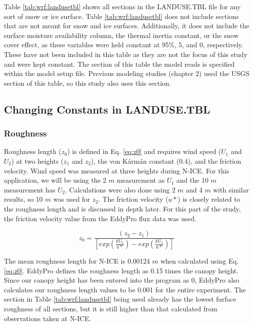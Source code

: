 Table \ref{tab:wrf:landusetbl} shows all sections in the LANDUSE.TBL file for any sort of snow or ice surface. Table \ref{tab:wrf:landusetbl} does not include sections that are not meant for snow and ice surfaces. Additionally, it does not include the surface moisture availability column, the thermal inertia constant, or the snow cover effect, as these variables were held constant at 95$\%$, 5, and 0, respectively. These have not been included in this table as they are not the focus of this study and were kept constant. The section of this table the model reads is specified within the model setup file. Previous modeling studies (chapter 2) used the USGS section of this table, so this study also uses this section. 

\subsection{Changing Constants in LANDUSE.TBL}
\subsubsection{Roughness}

Roughness length ($z_{0}$) is defined in Eq. \ref{eq:z0} and requires wind speed ($U_{1}$ and $U_{2}$) at two heights ($z_{1}$ and $z_{2}$), the von K\'{a}rm\'{a}n constant (0.4), and the friction velocity. Wind speed was measured at three heights during N-ICE. For this application, we will be using the 2 $m$ measurement as $U_{1}$ and the 10 $m$ measurement has $U_{2}$. Calculations were also done using 2 $m$ and 4 $m$ with similar results, so 10 $m$ was used for $z_{2}$. The friction velocity ($u*$) is closely related to the roughness length and is discussed in depth later. For this part of the study, the friction velocity value from the EddyPro flux data was used. 

\begin{equation}\label{eq:z0}
 z_{0} = \frac{(z_{2}-z_{1})}{[exp(\frac{kU_{2}}{u*}) - exp(\frac{kU_{1}}{u*})]} 
\end{equation}

The mean roughness length for N-ICE is 0.00124 $m$ when calculated using Eq. \ref{eq:z0}. EddyPro defines the roughness length as 0.15 times the canopy height. Since our canopy height has been entered into the program as 0, EddyPro also calculates our roughness length values to be 0.001 for the entire experiment. The section in Table \ref{tab:wrf:landusetbl} being used already has the lowest furface roughness of all sections, but it is still higher than that calculated from observations taken at N-ICE. 

